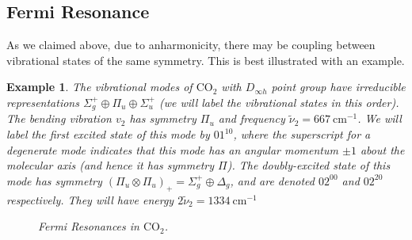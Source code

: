\documentclass{article}
\theoremstyle{plain}\theoremheaderfont{\normalfont\itshape}\theorembodyfont{\rmfamily}\theoremseparator{.}\newtheorem*{rem}{Remark}\newtheorem*{ex}{Example}\newtheorem*{proof}{Proof}\newtheorem*{altp}{Alternative proof}
\theoremstyle{plain}\theoremheaderfont{\normalfont\bfseries}\theorembodyfont{\rmfamily}\theoremseparator{.}\newtheorem{thm}{Theorem}[section]\newtheorem{lem}[thm]{Lemma}\newtheorem{prop}[thm]{Proposition}\newtheorem*{cor}{Corollary}\newtheorem{defn}[thm]{Definition}\newtheorem{clm}[thm]{Claim}\newtheorem{clminproof}{Claim}\newtheorem*{law}{Law}\newtheorem{pos}[thm]{Postulate}
\theoremstyle{break}\theoremheaderfont{\normalfont\itshape}\theorembodyfont{\rmfamily}\theoremseparator{.\medskip}\newtheorem*{proofskip}{Proof}\newtheorem*{exs}{Examples}\newtheorem*{rems}{Remarks}
\theoremstyle{break}\theoremheaderfont{\normalfont\bfseries}\theorembodyfont{\rmfamily}\theoremseparator{.\medskip}\newtheorem{lemskip}[thm]{Lemma}\newtheorem{defnskip}[thm]{Definition}\newtheorem{propskip}[thm]{Proposition}\newtheorem{thmskip}[thm]{Theorem}
\numberwithin{equation}{section}
\newcommand{\unit}[1]{\ \mathrm{#1}}
\begin{document}
    \subsection{Fermi Resonance}
    As we claimed above, due to anharmonicity, there may be coupling between vibrational states of the same symmetry. This is best illustrated with an example.
    \begin{ex}
        The vibrational modes of \(\mathrm{CO_2}\) with \(D_{\infty h}\) point group have irreducible representations \(\Sigma_g^+\oplus\Pi_u\oplus\Sigma_u^+\) (we will label the vibrational states in this order). The bending vibration \(v_2\) has symmetry \(\Pi_u\) and frequency \(\tilde{\nu}_2=667\unit{cm}^{-1}\). We will label the first excited state of this mode by \(01^10\), where the superscript for a degenerate mode indicates that this mode has an angular momentum \(\pm 1\) about the molecular axis (and hence it has symmetry \(\Pi\)). The doubly-excited state of this mode has symmetry \((\Pi_u\otimes\Pi_u)_+=\Sigma_g^+\oplus\Delta_g\), and are denoted \(02^00\) and \(02^20\) respectively. They will have energy \(2\tilde{\nu}_2=1334\unit{cm}^{-1}\)

        \begin{figure}[ht!]
            \centering
            \caption{Fermi Resonances in \(\mathrm{CO_2}\).}
        \end{figure}


\end{ex}
\end{document}
